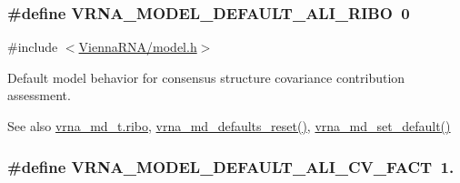 \subsubsection[{\texorpdfstring{V\+R\+N\+A\+\_\+\+M\+O\+D\+E\+L\+\_\+\+D\+E\+F\+A\+U\+L\+T\+\_\+\+A\+L\+I\+\_\+\+R\+I\+BO}{VRNA_MODEL_DEFAULT_ALI_RIBO}}]{\setlength{\rightskip}{0pt plus 5cm}\#define V\+R\+N\+A\+\_\+\+M\+O\+D\+E\+L\+\_\+\+D\+E\+F\+A\+U\+L\+T\+\_\+\+A\+L\+I\+\_\+\+R\+I\+BO~0}\hypertarget{group__model__details_ga64b3ab65a9ca42d4ad1d05e193083147}{}\label{group__model__details_ga64b3ab65a9ca42d4ad1d05e193083147}


{\ttfamily \#include $<$\hyperlink{model_8h}{Vienna\+R\+N\+A/model.\+h}$>$}



Default model behavior for consensus structure covariance contribution assessment. 

\begin{DoxySeeAlso}{See also}
\hyperlink{group__model__details_a3df2ae4bd9c133ef8ab92a53b1d035ec}{vrna\+\_\+md\+\_\+t.\+ribo}, \hyperlink{group__model__details_ga70834424cf804d149937de89f80ceb45}{vrna\+\_\+md\+\_\+defaults\+\_\+reset()}, \hyperlink{group__model__details_ga8ac6ff84936282436f822644bf841f66}{vrna\+\_\+md\+\_\+set\+\_\+default()} 
\end{DoxySeeAlso}
\subsubsection[{\texorpdfstring{V\+R\+N\+A\+\_\+\+M\+O\+D\+E\+L\+\_\+\+D\+E\+F\+A\+U\+L\+T\+\_\+\+A\+L\+I\+\_\+\+C\+V\+\_\+\+F\+A\+CT}{VRNA_MODEL_DEFAULT_ALI_CV_FACT}}]{\setlength{\rightskip}{0pt plus 5cm}\#define V\+R\+N\+A\+\_\+\+M\+O\+D\+E\+L\+\_\+\+D\+E\+F\+A\+U\+L\+T\+\_\+\+A\+L\+I\+\_\+\+C\+V\+\_\+\+F\+A\+CT~1.}\hypertarget{group__model__details_gaaaf3d73d6abc18d3889676952bfedb96}{}\label{group__model__details_gaaaf3d73d6abc18d3889676952bfedb96}



